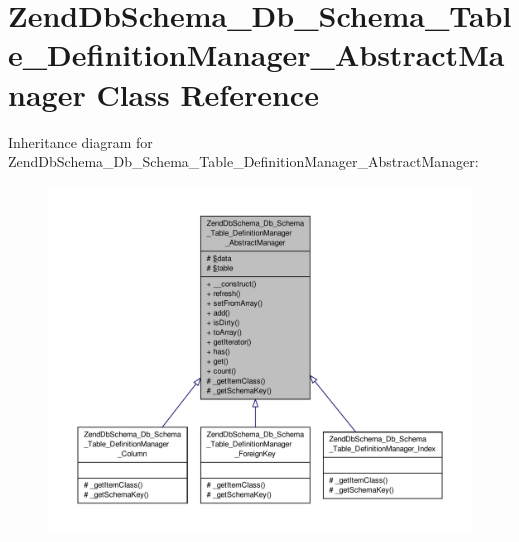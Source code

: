 \hypertarget{classZendDbSchema__Db__Schema__Table__DefinitionManager__AbstractManager}{\section{Zend\-Db\-Schema\-\_\-\-Db\-\_\-\-Schema\-\_\-\-Table\-\_\-\-Definition\-Manager\-\_\-\-Abstract\-Manager Class Reference}
\label{classZendDbSchema__Db__Schema__Table__DefinitionManager__AbstractManager}
}


Inheritance diagram for Zend\-Db\-Schema\-\_\-\-Db\-\_\-\-Schema\-\_\-\-Table\-\_\-\-Definition\-Manager\-\_\-\-Abstract\-Manager\-:\nopagebreak
\begin{figure}[H]
\begin{center}
\leavevmode
\includegraphics[width=350pt]{classZendDbSchema__Db__Schema__Table__DefinitionManager__AbstractManager__inherit__graph}
\end{center}
\end{figure}


